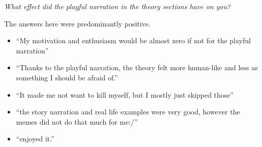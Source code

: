 \textit{What effect did the playful narration in the theory sections have on you?}

The answers here were predominantly positive.

\begin{itemize}
    \item \enquote{My motivation and enthusiasm would be almost zero if not for the playful narration}
    \item \enquote{Thanks to the playful narration, the theory felt more human-like and less as something I should be afraid of.}
    \item \enquote{It made me not want to kill myself, but I mostly just skipped those}
    \item \enquote{the story narration and real life examples were very good, however the memes did not do that much for me:/}
    \item \enquote{enjoyed it.}
\end{itemize}